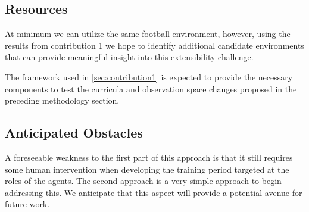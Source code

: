\subsection{Resources}
At minimum we can utilize the same football environment, however, using the results from 
contribution 1 we hope to identify additional candidate environments that can provide 
meaningful insight into this extensibility challenge.

The framework used in \cref{sec:contribution1} is expected to 
provide the necessary components to test the curricula and observation space 
changes proposed in the preceding methodology section.

\subsection{Anticipated Obstacles}

A foreseeable weakness to the first part of this approach is that it still requires some human 
intervention when developing the training period targeted at the roles of the agents.
The second approach is a very simple approach to begin addressing this.
We anticipate that this aspect will provide a potential avenue for future work.

